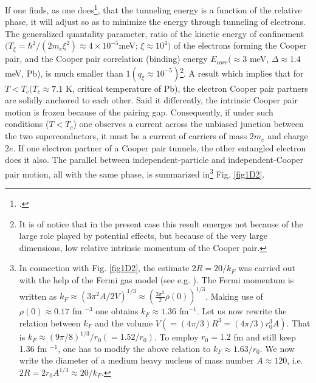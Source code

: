  
 If one finds, as one does\footnote{\cite{Josephson:62,Anderson:63}.}, that the tunneling energy is a function of the relative phase, it will adjust so as to minimize the energy through tunneling of electrons.  The generalized quantality parameter, ratio of the kinetic energy of confinement $(T_\xi=\hbar^2/(2m_e\xi^2)\approx4\times10^{-5}$meV; $\xi\approx10^4)$ of the electrons forming the Cooper pair, and the Cooper pair correlation (binding) energy $E_{corr}(\approx3$ meV, $\Delta\approx1.4$ meV, Pb), is much smaller than $1 (q_\xi\approx10^{-5})$\footnote{It is of notice that in the present case this result emerges not because of the large role played by potential effects, but because of the very large dimensions, low relative intrinsic momentum of the Cooper pair.}. A result which implies that for $T<T_c(T_c\approx7.1$ K, critical temperature of Pb), the electron Cooper pair partners are solidly anchored to each other. Said it differently, the intrinsic Cooper pair motion is frozen because of the pairing gap. Consequently, if under such conditions ($T<T_c$) one observes a current across the unbiased junction between the two superconductors, it must be a current of carriers of mass $2m_e$ and charge $2e$. If one electron partner of a Cooper pair tunnels, the other entangled electron does it also. 
 The parallel between independent-particle and independent-Cooper pair motion, all with the same phase, is summarized in\footnote{In connection with  Fig. \ref{fig1D2}, the estimate $2R=20/k_F$ was carried out with the help of the Fermi gas model (see e.g. \cite{Bohr:69}). The Fermi momentum is written as $k_F\approx (3\pi^2 A/2V)^{1/3}\approx (\frac{3\pi^2}{2}\rho(0))^{1/3}$. Making use of $\rho(0)\approx 0.17$ fm $^{-3}$ one obtains $k_F\approx 1.36 $ fm$^{-1}$. Let us now rewrite the relation between $k_F$ and the volume $V(=(4\pi/3) R^3=(4\pi/3) r_0^3 A)$. That is $k_F\approx (9\pi/8)^{1/3}/r_0(=1.52/r_0)$. To employ $r_0=1.2$ fm and still keep 1.36 fm $^{-1}$, one has to modify the above relation to $k_F\approx 1.63/r_0$. We now write the diameter of a medium heavy nucleus of mass number $A\approx 120$, i.e. $2R=2r_0A^{1/3}\approx 20/k_F$.} Fig. \ref{fig1D2}.
